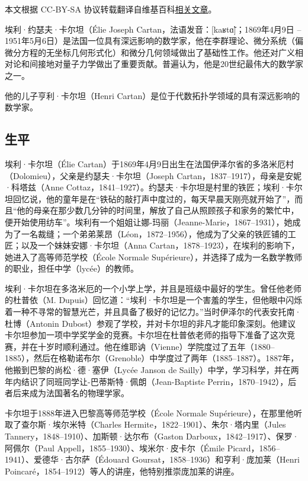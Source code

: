 
本文根据 CC-BY-SA 协议转载翻译自维基百科\href{https://en.wikipedia.org/wiki/\%C3\%89lie_Cartan}{相关文章}。

埃利·约瑟夫·卡尔坦（Élie Joseph Cartan，法语发音：[kaʁtɑ̃]；1869年4月9日 – 1951年5月6日）是法国一位具有深远影响的数学家，他在李群理论、微分系统（偏微分方程的无坐标几何形式化）和微分几何领域做出了基础性工作。他还对广义相对论和间接地对量子力学做出了重要贡献。普遍认为，他是20世纪最伟大的数学家之一。

他的儿子亨利·卡尔坦（Henri Cartan）是位于代数拓扑学领域的具有深远影响的数学家。
\subsection{生平}  
埃利·卡尔坦（Élie Cartan）于1869年4月9日出生在法国伊泽尔省的多洛米厄村（Dolomieu），父亲是约瑟夫·卡尔坦（Joseph Cartan，1837–1917），母亲是安妮·科塔兹（Anne Cottaz，1841–1927）。约瑟夫·卡尔坦是村里的铁匠；埃利·卡尔坦回忆说，他的童年是在“铁砧的敲打声中度过的，每天早晨天刚亮就开始了”，而且“他的母亲在那少数几分钟的时间里，解放了自己从照顾孩子和家务的繁忙中，便开始使用纺车”。埃利有一个姐姐让娜-玛丽（Jeanne-Marie，1867–1931），她成为了一名裁缝；一个弟弟莱昂（Léon，1872–1956），他成为了父亲的铁匠铺的工匠；以及一个妹妹安娜·卡尔坦（Anna Cartan，1878–1923），在埃利的影响下，她进入了高等师范学校（École Normale Supérieure），并选择了成为一名数学教师的职业，担任中学（lycée）的教师。

埃利·卡尔坦在多洛米厄的一个小学上学，并且是班级中最好的学生。曾任他老师的杜普依（M. Dupuis）回忆道：“埃利·卡尔坦是一个害羞的学生，但他眼中闪烁着一种不寻常的智慧光芒，并且具备了极好的记忆力。”当时伊泽尔的代表安托南·杜博（Antonin Dubost）参观了学校，并对卡尔坦的非凡才能印象深刻。他建议卡尔坦参加一项中学奖学金的竞赛。卡尔坦在杜普依老师的指导下准备了这次竞赛，并在十岁时顺利通过。他在维耶讷（Vienne）学院度过了五年（1880–1885），然后在格勒诺布尔（Grenoble）中学度过了两年（1885–1887）。1887年，他搬到巴黎的尚松·德·塞伊（Lycée Janson de Sailly）中学，学习科学，并在两年内结识了同班同学让-巴蒂斯特·佩朗（Jean-Baptiste Perrin，1870–1942），后者后来成为法国著名的物理学家。

卡尔坦于1888年进入巴黎高等师范学校（École Normale Supérieure），在那里他听取了查尔斯·埃尔米特（Charles Hermite，1822–1901）、朱尔·塔内里（Jules Tannery，1848–1910）、加斯顿·达尔布（Gaston Darboux，1842–1917）、保罗·阿佩尔（Paul Appell，1855–1930）、埃米尔·皮卡尔（Émile Picard，1856–1941）、爱德华·古尔萨（Édouard Goursat，1858–1936）和亨利·庞加莱（Henri Poincaré，1854–1912）等人的讲座，他特别推崇庞加莱的讲座。

